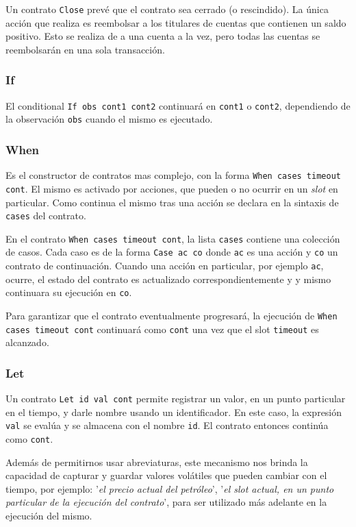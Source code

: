 \documentclass[12pt]{book}
\begin{document}
Un contrato \texttt{Close} prevé que el contrato sea cerrado (o rescindido). La única acción que realiza es reembolsar a los titulares de cuentas que contienen un saldo positivo. Esto se realiza de a una cuenta a la vez, pero todas las cuentas se reembolsarán en una sola transacción.

\subsubsection{If}
El conditional \texttt{If obs cont1 cont2} continuará en \texttt{cont1} o \texttt{cont2}, dependiendo de la observación \texttt{obs} cuando el mismo es ejecutado.

\subsubsection{When}
Es el constructor de contratos mas complejo, con la forma \texttt{When cases timeout cont}. El mismo es activado por acciones, que pueden o no ocurrir en un \textit{slot} en particular. Como continua el mismo tras una acción se declara en la sintaxis de \texttt{cases} del contrato.

En el contrato \texttt{When cases timeout cont}, la lista \texttt{cases} contiene una colección de casos. Cada caso es de la forma \texttt{Case ac co} donde \texttt{ac} es una acción y \texttt{co} un contrato de continuación. Cuando una acción en particular, por ejemplo \texttt{ac}, ocurre, el estado del contrato es actualizado correspondientemente y y mismo continuara su ejecución en \texttt{co}.

Para garantizar que el contrato eventualmente progresará, la ejecución de \texttt{When cases timeout cont} continuará como \texttt{cont} una vez que el slot \texttt{timeout} es alcanzado.

\subsubsection{Let}

Un contrato \texttt{Let id val cont} permite registrar un valor, en un punto particular en el tiempo, y darle nombre usando un identificador. En este caso, la expresión \texttt{val} se evalúa y se almacena con el nombre \texttt{id}. El contrato entonces continúa como \texttt{cont}.

Además de permitirnos usar abreviaturas, este mecanismo nos brinda la capacidad de capturar y guardar valores volátiles que pueden cambiar con el tiempo, por ejemplo: '\textit{el precio actual del petróleo}', '\textit{el slot actual, en un punto particular de la ejecución del contrato}', para ser utilizado más adelante en la ejecución del mismo.
\end{document}
